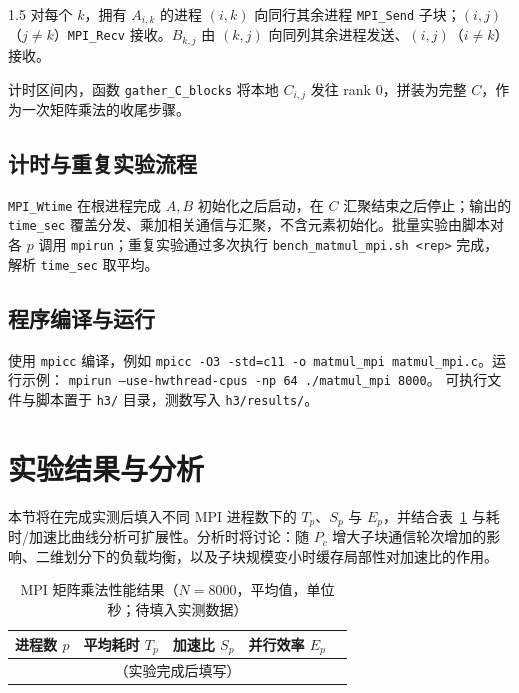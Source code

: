 \documentclass[zihao=-4]{ctexart}
\begin{document}
\begin{spacing}{1.5}
对每个 \(k\)，拥有 \(A_{i,k}\) 的进程 \((i,k)\) 向同行其余进程 \texttt{MPI\_Send} 子块；\((i,j)\)（\(j\neq k\)）\texttt{MPI\_Recv} 接收。\(B_{k,j}\) 由 \((k,j)\) 向同列其余进程发送、\((i,j)\)（\(i\neq k\)）接收。

计时区间内，函数 \texttt{gather\_C\_blocks} 将本地 \(C_{i,j}\) 发往 rank 0，拼装为完整 \(C\)，作为一次矩阵乘法的收尾步骤。

\subsection{计时与重复实验流程}
\texttt{MPI\_Wtime} 在根进程完成 \(A,B\) 初始化之后启动，在 \(C\) 汇聚结束之后停止；输出的 \texttt{time\_sec} 覆盖分发、乘加相关通信与汇聚，不含元素初始化。批量实验由脚本对各 \(p\) 调用 \texttt{mpirun}；重复实验通过多次执行 \texttt{bench\_matmul\_mpi.sh <rep>} 完成，解析 \texttt{time\_sec} 取平均。

\subsection{程序编译与运行}
使用 \texttt{mpicc} 编译，例如 \texttt{mpicc -O3 -std=c11 -o matmul\_mpi matmul\_mpi.c}。运行示例：
\texttt{mpirun --use-hwthread-cpus -np 64 ./matmul\_mpi 8000}。
可执行文件与脚本置于 \texttt{h3/} 目录，测数写入 \texttt{h3/results/}。

\section{实验结果与分析}

本节将在完成实测后填入不同 MPI 进程数下的 \(T_p\)、\(S_p\) 与 \(E_p\)，并结合表~\ref{tab:matmul-bench} 与耗时/加速比曲线分析可扩展性。分析时将讨论：随 \(P_c\) 增大子块通信轮次增加的影响、二维划分下的负载均衡，以及子块规模变小时缓存局部性对加速比的作用。

\begin{table}[H]
\small
\centering
\caption{MPI 矩阵乘法性能结果（\(N=8000\)，平均值，单位秒；待填入实测数据）}
\label{tab:matmul-bench}
\begin{tabular}{rrrrr}
\toprule
进程数 \(p\) & 平均耗时 \(T_p\) & 加速比 \(S_p\) & 并行效率 \(E_p\) \\
\midrule
\multicolumn{5}{c}{（实验完成后填写）} \\
\bottomrule
\end{tabular}
\end{table}


\end{spacing}
\end{document}
